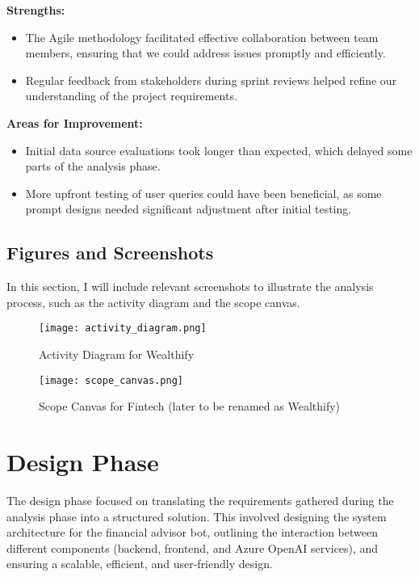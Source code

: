 \documentclass[a4paper,12pt]{report}
\begin{document}
\textbf{Strengths:}
\begin{itemize}
    \item The Agile methodology facilitated effective collaboration between team members, ensuring that we could address issues promptly and efficiently.
    \item Regular feedback from stakeholders during sprint reviews helped refine our understanding of the project requirements.
\end{itemize}

\textbf{Areas for Improvement:}
\begin{itemize}
    \item Initial data source evaluations took longer than expected, which delayed some parts of the analysis phase.
    \item More upfront testing of user queries could have been beneficial, as some prompt designs needed significant adjustment after initial testing.
\end{itemize}

\subsection*{Figures and Screenshots}
In this section, I will include relevant screenshots to illustrate the analysis process, such as the activity diagram and the scope canvas.

\begin{figure}[H]
    \centering
\texttt{[image: activity\_diagram.png]}
\caption{Activity Diagram for Wealthify}
\end{figure}

\begin{figure}[H]
    \centering
\texttt{[image: scope\_canvas.png]}
\caption{Scope Canvas for Fintech (later to be renamed as Wealthify)}
\end{figure}

\section{Design Phase}
The design phase focused on translating the requirements gathered during the analysis phase into a structured solution. This involved designing the system architecture for the financial advisor bot, outlining the interaction between different components (backend, frontend, and Azure OpenAI services), and ensuring a scalable, efficient, and user-friendly design.
\end{document}
